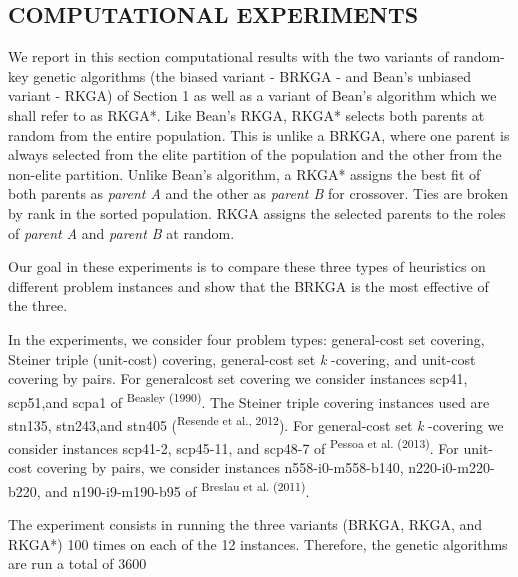 \begin{multicols}{2}
\section*{COMPUTATIONAL EXPERIMENTS}
\par{}We report in this section computational results with the two variants of random-\allowbreak{}key genetic algorithms (\allowbreak{}the biased variant -\allowbreak{} BRKGA -\allowbreak{} and Bean's unbiased variant -\allowbreak{} RKGA)\allowbreak{} of Section 1 as well as a variant of Bean's algorithm which we shall refer to as RKGA*\allowbreak{}.\allowbreak{} Like Bean's RKGA,\allowbreak{} RKGA*\allowbreak{} selects both parents at random from the entire population.\allowbreak{} This is unlike a BRKGA,\allowbreak{} where one parent is always selected from the elite partition of the population and the other from the non-\allowbreak{}elite partition.\allowbreak{} Unlike Bean's algorithm,\allowbreak{} a RKGA*\allowbreak{} assigns the best fit of both parents as \textit{parent A} and the other as \textit{parent B} for crossover.\allowbreak{} Ties are broken by rank in the sorted population.\allowbreak{} RKGA assigns the selected parents to the roles of \textit{parent A} and \textit{parent B} at random.\allowbreak{}\par{}Our goal in these experiments is to compare these three types of heuristics on different problem instances and show that the BRKGA is the most effective of the three.\allowbreak{}\par{}In the experiments,\allowbreak{} we consider four problem types:\allowbreak{} general-\allowbreak{}cost set covering,\allowbreak{} Steiner triple (\allowbreak{}unit-\allowbreak{}cost)\allowbreak{} covering,\allowbreak{} general-\allowbreak{}cost set \textit{k} -\allowbreak{}covering,\allowbreak{} and unit-\allowbreak{}cost covering by pairs.\allowbreak{} For generalcost set covering we consider instances scp41,\allowbreak{} scp51,\allowbreak{}and scpa1 of \textsuperscript{Beasley (\allowbreak{}1990)\allowbreak{}}.\allowbreak{} The Steiner triple covering instances used are stn135,\allowbreak{} stn243,\allowbreak{}and stn405 (\allowbreak{}\textsuperscript{Resende et al.\allowbreak{},\allowbreak{} 2012})\allowbreak{}.\allowbreak{} For general-\allowbreak{}cost set \textit{k} -\allowbreak{}covering we consider instances scp41-\allowbreak{}2,\allowbreak{} scp45-\allowbreak{}11,\allowbreak{} and scp48-\allowbreak{}7 of \textsuperscript{Pessoa et al.\allowbreak{} (\allowbreak{}2013)\allowbreak{}}.\allowbreak{} For unit-\allowbreak{}cost covering by pairs,\allowbreak{} we consider instances n558-\allowbreak{}i0-\allowbreak{}m558-\allowbreak{}b140,\allowbreak{} n220-\allowbreak{}i0-\allowbreak{}m220-\allowbreak{}b220,\allowbreak{} and n190-\allowbreak{}i9-\allowbreak{}m190-\allowbreak{}b95 of \textsuperscript{Breslau et al.\allowbreak{} (\allowbreak{}2011)\allowbreak{}}.\allowbreak{}\par{}The experiment consists in running the three variants (\allowbreak{}BRKGA,\allowbreak{} RKGA,\allowbreak{} and RKGA*\allowbreak{})\allowbreak{} 100 times on each of the 12 instances.\allowbreak{} Therefore,\allowbreak{} the genetic algorithms are run a total of 3600 
\end{multicols}

